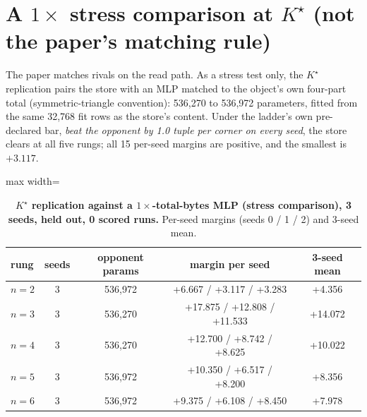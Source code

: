 \documentclass{article} %
\newcommand{\Kstar}{\ensuremath{K^{\star}}}
\begin{document}
\section{A $1\times$ stress comparison at $\Kstar$ (not the paper's matching rule)}
\label{app:1x}

The paper matches rivals on the read path. As a stress test only, the $\Kstar$ replication pairs
the store with an MLP matched to the object's own four-part total (symmetric-triangle
convention): 536,270 to 536,972 parameters, fitted from the same 32,768 fit rows as the store's
content. %
Under the ladder's own pre-declared bar, \emph{beat the opponent by 1.0 tuple per corner on every
seed}, the store clears at all five rungs; all 15 per-seed margins are positive, and the smallest
is $+3.117$. %

\begin{table}[h]
\centering\small
\caption{\textbf{$\Kstar$ replication against a $1\times$-total-bytes MLP (stress comparison),
3 seeds, held out, 0 scored runs.} Per-seed margins (seeds 0 / 1 / 2) and 3-seed mean.}
\label{tab:1x}
\begin{adjustbox}{max width=\linewidth}\begin{tabular}{lcccc}
\toprule
rung & seeds & opponent params & margin per seed & 3-seed mean \\
\midrule
$n=2$ & 3 & 536,972 & +6.667 / +3.117 / +3.283 & +4.356 \\
$n=3$ & 3 & 536,270 & +17.875 / +12.808 / +11.533 & +14.072 \\
$n=4$ & 3 & 536,270 & +12.700 / +8.742 / +8.625 & +10.022 \\
$n=5$ & 3 & 536,972 & +10.350 / +6.517 / +8.200 & +8.356 \\
$n=6$ & 3 & 536,972 & +9.375 / +6.108 / +8.450 & +7.978 \\
\bottomrule
\end{tabular}\end{adjustbox}
\end{table}
\end{document}
